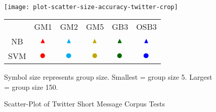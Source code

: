 \paragraph*{}
	\begin{sidewaysfigure}[htbp!]
		\begin{center}
		\centering
		\texttt{[image: plot-scatter-size-accuracy-twitter-crop]}

		\begin{tabular}{cccccc}
			
			  	& GM1	& GM2	& GM5	& GB3	& OSB3	\\
			NB	& $ \color{red} \blacktriangle$ & $\color{cyan} \blacktriangle$ & $\color{MyDarkYellow} \blacktriangle$ & $\color{MyOliveGreen} \blacktriangle$ & $\color{blue} \blacktriangle$ \\ 					
			SVM	& $ \color{red} \CIRCLE$ & $\color{cyan} \CIRCLE$ & $\color{MyDarkYellow} \CIRCLE$ & $\color{MyOliveGreen} \CIRCLE$ & $\color{blue} \CIRCLE$ \\	
			
		\end{tabular}
		\begin{comment}	
		\begin{tabular}{ccc}
			& NB 					& SVM 					\\
		GM1 	& $\color{red} \blacktriangle$		& $\color{red} \CIRCLE$			\\
		GM2 	& $\color{cyan} \blacktriangle$		& $\color{cyan} \CIRCLE$		\\
		GM5 	& $\color{MyDarkYellow} \blacktriangle$	& $\color{MyDarkYellow} \CIRCLE$	\\
		GB3 	& $\color{MyOliveGreen} \blacktriangle$	& $\color{MyOliveGreen} \CIRCLE$	\\
		OSB3 	& $\color{red} \blacktriangle$		& $\color{red} \CIRCLE$			\\
		\end{tabular}
		
		\end{comment}
		\begin{singlespace}
		Symbol size represents group size.  Smallest = group size 5.  Largest = group size 150.  
		\end{singlespace}
		
		\caption{Scatter-Plot of Twitter Short Message Corpus Tests}
		\label{fig:plot-scatter-twitter}
		\end{center}
	\end{sidewaysfigure}

